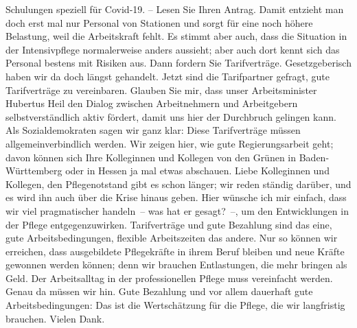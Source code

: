 \documentclass{article}
\begin{document}
Schulungen speziell für Covid‑19.  – Lesen Sie Ihren Antrag.  Damit entzieht man doch erst mal nur Personal von Stationen und sorgt für eine noch höhere Belastung, weil die Arbeitskraft fehlt. Es stimmt aber auch, dass die Situation in der Intensivpflege normalerweise anders aussieht; aber auch dort kennt sich das Personal bestens mit Risiken aus. Dann fordern Sie Tarifverträge. Gesetzgeberisch haben wir da doch längst gehandelt. Jetzt sind die Tarifpartner gefragt, gute Tarifverträge zu vereinbaren. Glauben Sie mir, dass unser Arbeitsminister Hubertus Heil den Dialog zwischen Arbeitnehmern und Arbeitgebern selbstverständlich aktiv fördert, damit uns hier der Durchbruch gelingen kann.  Als Sozialdemokraten sagen wir ganz klar: Diese Tarifverträge müssen allgemeinverbindlich werden.  Wir zeigen hier, wie gute Regierungsarbeit geht; davon können sich Ihre Kolleginnen und Kollegen von den Grünen in Baden-Württemberg oder in Hessen ja mal etwas abschauen.  Liebe Kolleginnen und Kollegen, den Pflegenotstand gibt es schon länger; wir reden ständig darüber, und es wird ihn auch über die Krise hinaus geben.  Hier wünsche ich mir einfach, dass wir viel pragmatischer handeln – was hat er gesagt? –, um den Entwicklungen in der Pflege entgegenzuwirken. Tarifverträge und gute Bezahlung sind das eine, gute Arbeitsbedingungen, flexible Arbeitszeiten das andere. Nur so können wir erreichen, dass ausgebildete Pflegekräfte in ihrem Beruf bleiben und neue Kräfte gewonnen werden können;  denn wir brauchen Entlastungen, die mehr bringen als Geld. Der Arbeitsalltag in der professionellen Pflege muss vereinfacht werden. Genau da müssen wir hin.  Gute Bezahlung und vor allem dauerhaft gute Arbeitsbedingungen: Das ist die Wertschätzung für die Pflege, die wir langfristig brauchen. Vielen Dank.   
\end{document}
